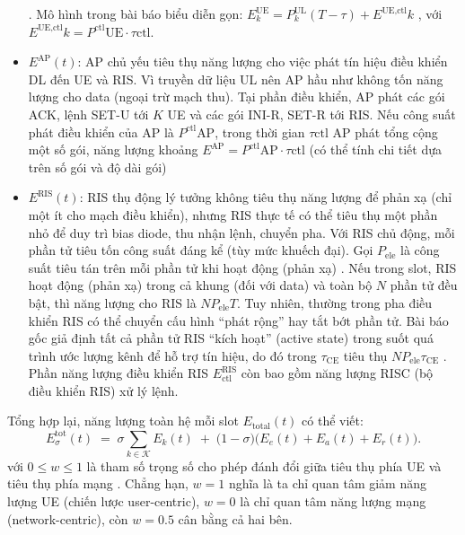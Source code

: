 \begin{itemize}
. Mô hình trong bài báo biểu diễn gọn: $E^\text{UE}_k = P^\text{UL}_k (T-\tau) + E^\text{UE,ctl}k$
\cite{ris_latency}
, với $E^\text{UE,ctl}k = P^\text{ctl}\text{UE} \cdot \tau\text{ctl}$.
    \item $E^\text{AP}(t)$: AP chủ yếu tiêu thụ năng lượng cho việc phát tín hiệu điều khiển DL đến UE và RIS. Vì truyền dữ liệu UL nên AP hầu như không tốn năng lượng cho data (ngoại trừ mạch thu). Tại phần điều khiển, AP phát các gói ACK, lệnh SET-U tới $K$ UE và các gói INI-R, SET-R tới RIS. Nếu công suất phát điều khiển của AP là $P^\text{ctl}\text{AP}$, trong thời gian $\tau\text{ctl}$ AP phát tổng cộng một số gói, năng lượng khoảng $E^\text{AP} = P^\text{ctl}\text{AP} \cdot \tau\text{ctl}$ (có thể tính chi tiết dựa trên số gói và độ dài gói)
    \item $E^\text{RIS}(t)$: RIS thụ động lý tưởng không tiêu thụ năng lượng để phản xạ (chỉ một ít cho mạch điều khiển), nhưng RIS thực tế có thể tiêu thụ một phần nhỏ để duy trì bias diode, thu nhận lệnh, chuyển pha. Với RIS chủ động, mỗi phần tử tiêu tốn công suất đáng kể (tùy mức khuếch đại). Gọi $P_\text{ele}$ là công suất tiêu tán trên mỗi phần tử khi hoạt động (phản xạ)
. Nếu trong slot, RIS hoạt động (phản xạ) trong cả khung (đối với data) và toàn bộ $N$ phần tử đều bật, thì năng lượng cho RIS là $N P_\text{ele} T$. Tuy nhiên, thường trong pha điều khiển RIS có thể chuyển cấu hình “phát rộng” hay tắt bớt phần tử. Bài báo gốc giả định tất cả phần tử RIS “kích hoạt” (active state) trong suốt quá trình ước lượng kênh để hỗ trợ tín hiệu, do đó trong $\tau_\text{CE}$ tiêu thụ $N P_\text{ele} \tau_\text{CE}$
. Phần năng lượng điều khiển RIS $E^\text{RIS}_\text{ctl}$ còn bao gồm năng lượng RISC (bộ điều khiển RIS) xử lý lệnh.

\end{itemize}

Tổng hợp lại, năng lượng toàn hệ mỗi slot $E_\text{total}(t)$ có thể viết: 
\begin{equation}\label{eq:Etot_sigma}
E_{\sigma}^{\mathrm{tot}}(t)
\;=\;
\sigma \sum_{k \in \mathcal{K}} E_{k}(t)
\;+\;
\bigl(1 - \sigma\bigr)\bigl(E_{e}(t) + E_{a}(t) + E_{r}(t)\bigr).
\end{equation}
với $0 \le w \le 1$ là tham số trọng số cho phép đánh đổi giữa tiêu thụ phía UE và tiêu thụ phía mạng
. Chẳng hạn, $w=1$ nghĩa là ta chỉ quan tâm giảm năng lượng UE (chiến lược user-centric), $w=0$ là chỉ quan tâm năng lượng mạng (network-centric), còn $w=0.5$ cân bằng cả hai bên.


